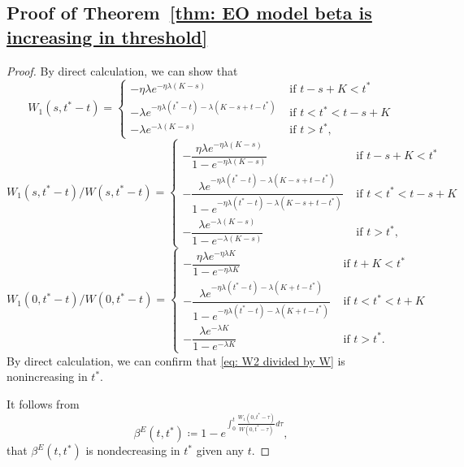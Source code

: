 \documentclass[12pt, letterpaper]{article}
\begin{document}
\subsection{Proof of Theorem~\ref{thm: EO model beta is increasing in threshold}}

\begin{proof}
By direct calculation, we can show that
\begin{equation}
    W_1(s, t^* - t) = \begin{cases}
        - \eta\lambda e^{- \eta \lambda (K - s)} & \text{ if } t - s + K < t^*\\
        - \lambda e^{- \eta \lambda (t^* - t) - \lambda (K - s + t - t^*)} & \text{ if } t < t^* < t - s + K\\
        - \lambda e^{- \lambda (K - s)} & \text{ if } t > t^*,
    \end{cases}
\end{equation}
\begin{equation}
    W_1(s, t^* - t)/W(s, t^* - t) = 
    \begin{cases}
        -\dfrac{\eta\lambda e^{- \eta \lambda (K - s)}}{1 - e^{- \eta \lambda (K - s)}} & \text{ if } t - s + K < t^*\\
        -\dfrac{\lambda e^{- \eta \lambda (t^* - t) - \lambda (K - s + t - t^*)}}{1 - e^{- \eta \lambda (t^* - t) - \lambda (K - s + t - t^*)}} & \text{ if } t < t^* < t - s + K\\
        -\dfrac{\lambda e^{- \lambda (K - s)}}{1 - e^{- \lambda (K - s)}} & \text{ if } t > t^*,   
    \end{cases}
\end{equation}
\begin{equation}\label{eq: W2 divided by W}
    W_1(0, t^* - t)/W(0, t^* - t) = 
    \begin{cases}
        -\dfrac{\eta\lambda e^{- \eta \lambda K}}{1 - e^{- \eta \lambda K}} & \text{ if } t + K < t^*\\
        -\dfrac{\lambda e^{- \eta \lambda (t^* - t) - \lambda (K + t - t^*)}}{1 - e^{- \eta \lambda (t^* - t) - \lambda (K + t - t^*)}} & \text{ if } t < t^* < t + K\\
        -\dfrac{\lambda e^{- \lambda K}}{1 - e^{- \lambda K}} & \text{ if } t > t^*.   
    \end{cases}
\end{equation}
By direct calculation, we can confirm that \eqref{eq: W2 divided by W} is nonincreasing in $t^*$. 

It follows from
\begin{equation}
    \beta^E(t, t^*) \coloneqq 1 - e^{\int_0^t \frac{W_1(0, t^* - \tau)}{W(0, t^* - \tau)}d\tau},
    \end{equation}
that $\beta^E(t, t^*)$ is nondecreasing in $t^*$ given any $t$.
\end{proof} %
\end{document}
